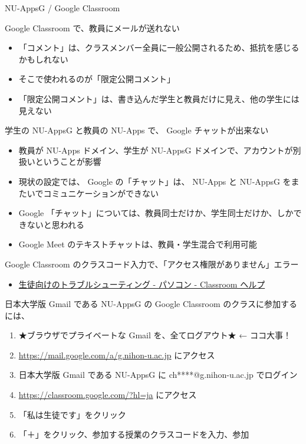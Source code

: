 \documentclass[a4j,10pt]{jsarticle}
\begin{document}
{\begin{frame}[label={sec:org25495ab},fragile]{NU-AppsG / Google Classroom}
\begin{block}{Google Classroom で、教員にメールが送れない}
\begin{itemize}
\item 「コメント」は、クラスメンバー全員に一般公開されるため、抵抗を感じるかもしれない
\item そこで使われるのが「限定公開コメント」
\item 「限定公開コメント」は、書き込んだ学生と教員だけに見え、他の学生には見えない
\end{itemize}
\end{block}
\par
\begin{block}{学生の NU-AppsG と教員の NU-Apps で、 Google チャットが出来ない}
\begin{itemize}
\item 教員が NU-Apps ドメイン、学生が NU-AppsG ドメインで、アカウントが別扱いということが影響
\item 現状の設定では、 Google の「チャット」は、 NU-Apps と NU-AppsG をまたいでコミュニケーションができない
\item Google 「チャット」については、教員同士だけか、学生同士だけか、しかできないと思われる
\item Google Meet のテキストチャットは、教員・学生混合で利用可能
\end{itemize}
\end{block}
\par
\begin{block}{Google Classroom のクラスコード入力で、「アクセス権限がありません」エラー}
\begin{itemize}
\item \href{https://support.google.com/edu/classroom/answer/6315899?co=GENIE.Platform\%3DDesktop\&hl=ja}{生徒向けのトラブルシューティング - パソコン - Classroom ヘルプ}
\end{itemize}
\par
日本大学版 Gmail である NU-AppsG の Google Classroom のクラスに参加するには、
\par
\begin{enumerate}
\item ★ブラウザでプライベートな Gmail を、全てログアウト★ ← ココ大事！
\item \url{https://mail.google.com/a/g.nihon-u.ac.jp} にアクセス
\item 日本大学版 Gmail である NU-AppsG に ch****@g.nihon-u.ac.jp でログイン
\item \url{https://classroom.google.com/?hl=ja} にアクセス
\item 「私は生徒です」をクリック
\item 「＋」をクリック、参加する授業のクラスコードを入力、参加

\end{enumerate}
\end{block}
\end{frame}}
\end{document}
